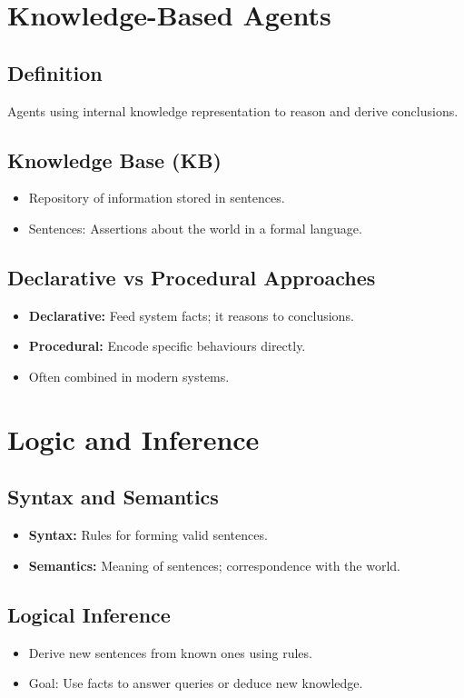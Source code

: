 \section{Knowledge-Based Agents}

\subsection{Definition}
Agents using internal knowledge representation to reason and derive conclusions.

\subsection{Knowledge Base (KB)}
\begin{itemize}
    \item Repository of information stored in sentences.
    \item Sentences: Assertions about the world in a formal language.
\end{itemize}

\subsection{Declarative vs Procedural Approaches}
\begin{itemize}
    \item \textbf{Declarative:} Feed system facts; it reasons to conclusions.
    \item \textbf{Procedural:} Encode specific behaviours directly.
    \item Often combined in modern systems.
\end{itemize}

\section{Logic and Inference}

\subsection{Syntax and Semantics}
\begin{itemize}
    \item \textbf{Syntax:} Rules for forming valid sentences.
    \item \textbf{Semantics:} Meaning of sentences; correspondence with the world.
\end{itemize}

\subsection{Logical Inference}
\begin{itemize}
    \item Derive new sentences from known ones using rules.
    \item Goal: Use facts to answer queries or deduce new knowledge.
\end{itemize}


